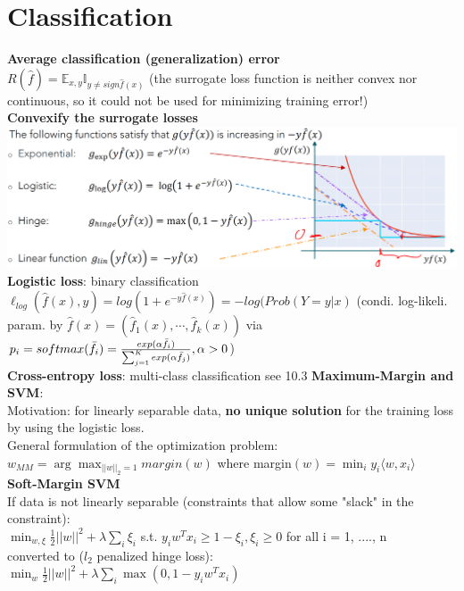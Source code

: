 
\section{Classification}
\textbf{Average classification (generalization) error}\\
$R(\hat{f}) = \mathbb{E}_{x,y}\mathbb{I}_{y \neq sign \hat{f}(x)}$ (the surrogate loss function is neither convex nor continuous, so it could not be used for minimizing training error!) \\
\textbf{Convexify the surrogate losses}\\
\includegraphics[width=\linewidth]{pics/figure5.PNG} 
\textbf{Logistic loss}: binary classification\\
$\ell_{log}(\hat{f}(x), y) = log(1 + e^{-y\hat{f}(x)}) = -log(Prob(Y=y|x)$ (condi. log-likeli.  param. by $\hat{f}(x) = (\hat{f}_1(x), \cdots, \hat{f}_k(x))$ via $p_i = softmax(\bar{f}_i) = \frac{exp(\alpha \Bar{f_i})}{ \sum_{j=1}^K exp(\alpha \Bar{f_j})}, \alpha > 0$) \\
\textbf{Cross-entropy loss}: multi-class classification see 10.3
\textbf{Maximum-Margin and SVM}: \\
Motivation: for linearly separable data, \textbf{no unique solution} for the training loss by using the logistic loss. \\
General formulation of the optimization problem: $w_{MM} = \arg \max_{||w||_2 = 1} margin(w)$ where margin$(w)=\min_{i} y_i\langle  w , x_i \rangle$  \\
\textbf{Soft-Margin SVM} \\
If data is not linearly separable (constraints that allow some "slack" in the constraint):\\
$\min_{w,\xi} \frac{1}{2}||w||^2 + \lambda\sum_{i} \xi_{i}$ 
s.t. ${y_i}{w^T}{x_i} \geq 1 - \xi_{i}, {\xi_{i} \geq 0}$ for all i = 1, ...., n\\
converted to ($l_2$ penalized hinge loss):\\
$\min_{w} \frac{1}{2}||w||^2 + \lambda\sum_{i} \max(0, 1-{y_i}{w^T}{x_i})$\\

